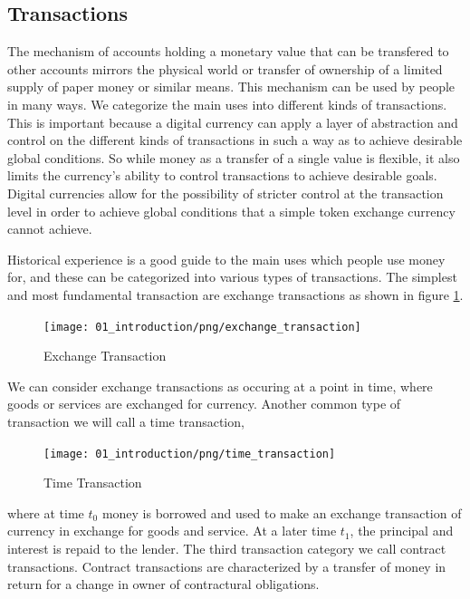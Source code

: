 \subsection{Transactions}

The mechanism of accounts holding a monetary value that can be transfered to other accounts mirrors
the physical world or transfer of ownership of a limited supply of paper money or similar means.
This mechanism can be used by people in many ways. We categorize the main uses into different kinds
of transactions. This is important because a digital currency can apply a layer of abstraction and
control on the different kinds of transactions in such a way as to achieve desirable global
conditions. So while money as a transfer of a single value is flexible, it also limits the
currency's ability to control transactions to achieve desirable goals. Digital currencies allow for
the possibility of stricter control at the transaction level in order to achieve global conditions
that a simple token exchange currency cannot achieve. 

Historical experience is a good guide to the main uses which people use money for,
and these can be categorized into various types of transactions. The simplest and most fundamental
transaction are exchange transactions as shown in figure \ref{fig:exchange_transaction1}.

\begin{figure}[H]
\centering
\texttt{[image: 01\_introduction/png/exchange\_transaction]}
\caption{Exchange Transaction}
\label{fig:exchange_transaction1}
\end{figure}

We can consider exchange transactions as occuring at a point in time, where goods or services are
exchanged for currency. Another common type of transaction we will call a time transaction,

\begin{figure}[H]
\centering
\texttt{[image: 01\_introduction/png/time\_transaction]}
\caption{Time Transaction}
\label{fig:time_transaction1}
\end{figure}

where at time $t_0$ money is borrowed and used to make an exchange transaction of currency in
exchange for goods and service. At a later time $t_1$, the principal and interest is repaid to the
lender. The third transaction category we call contract transactions. Contract transactions are
characterized by a transfer of money in return for a change in owner of contractural obligations.

